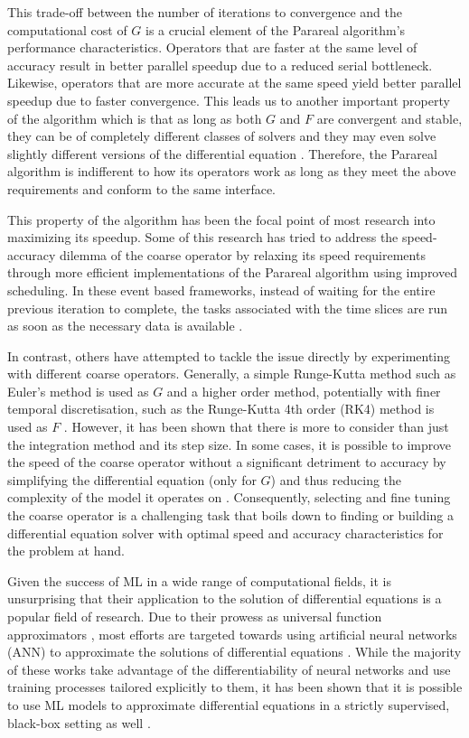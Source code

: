 \documentclass{article}
\begin{document}
This trade-off between the number of iterations to convergence and the computational cost of $G$ is a crucial element of the Parareal algorithm's performance characteristics. Operators that are faster at the same level of accuracy result in better parallel speedup due to a reduced serial bottleneck. Likewise, operators that are more accurate at the same speed yield better parallel speedup due to faster convergence. This leads us to another important property of the algorithm which is that as long as both $G$ and $F$ are convergent and stable, they can be of completely different classes of solvers and they may even solve slightly different versions of the differential equation \cite[p.~8]{staff2003}. Therefore, the Parareal algorithm is indifferent to how its operators work as long as they meet the above requirements and conform to the same interface.

This property of the algorithm has been the focal point of most research into maximizing its speedup. Some of this research has tried to address the speed-accuracy dilemma of the coarse operator by relaxing its speed requirements through more efficient implementations of the Parareal algorithm using improved scheduling. In these event based frameworks, instead of waiting for the entire previous iteration to complete, the tasks associated with the time slices are run as soon as the necessary data is available \cite{aubanel2011} \cite{berry2012}.

In contrast, others have attempted to tackle the issue directly by experimenting with different coarse operators. Generally, a simple Runge-Kutta method \cite{runge1895} such as Euler's method is used as $G$ and a higher order method, potentially with finer temporal discretisation, such as the Runge-Kutta 4th order (RK4) method is used as $F$ \cite[p.~1822]{gurrala2015} \cite[p.~2]{duan2016}. However, it has been shown that there is more to consider than just the integration method and its step size. In some cases, it is possible to improve the speed of the coarse operator without a significant detriment to accuracy by simplifying the differential equation (only for $G$) and thus reducing the complexity of the model it operates on \cite{duan2016}. Consequently, selecting and fine tuning the coarse operator is a challenging task that boils down to finding or building a differential equation solver with optimal speed and accuracy characteristics for the problem at hand.

Given the success of ML in a wide range of computational fields, it is unsurprising that their application to the solution of differential equations is a popular field of research. Due to their prowess as universal function approximators \cite{hornik1991}, most efforts are targeted towards using artificial neural networks (ANN) to approximate the solutions of differential equations \cite{lagaris1998} \cite{lagaris2000} \cite{han2018}. While the majority of these works take advantage of the differentiability of neural networks and use training processes tailored explicitly to them, it has been shown that it is possible to use ML models to approximate differential equations in a strictly supervised, black-box setting as well \cite{regazzoni2019}.
\end{document}
